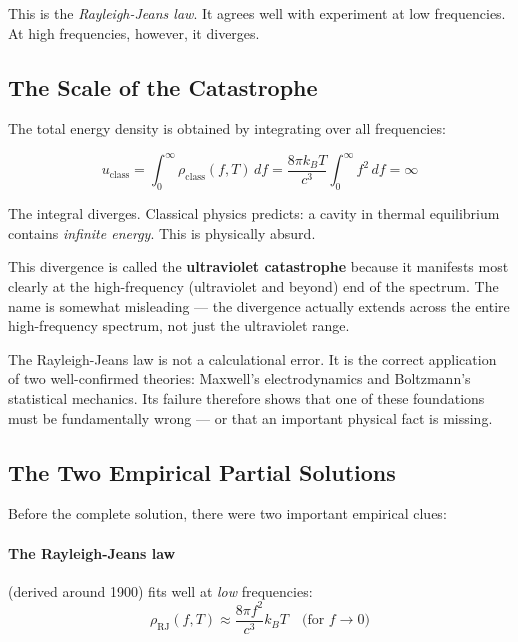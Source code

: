This is the \emph{Rayleigh-Jeans law}. It agrees well with experiment at low 
frequencies. At high frequencies, however, it diverges.

\subsection{The Scale of the Catastrophe}

The total energy density is obtained by integrating over all frequencies:

\begin{equation}
    u_{\text{class}} = \int_0^\infty \rho_{\text{class}}(f, T) \, df 
    = \frac{8\pi k_B T}{c^3} \int_0^\infty f^2 \, df = \infty
    \label{eq:uv_divergence}
\end{equation}

The integral diverges. Classical physics predicts: a cavity in thermal equilibrium 
contains \emph{infinite energy}. This is physically absurd.

This divergence is called the \textbf{ultraviolet catastrophe} because it manifests 
most clearly at the high-frequency (ultraviolet and beyond) end of the spectrum. 
The name is somewhat misleading — the divergence actually extends across the entire 
high-frequency spectrum, not just the ultraviolet range.

\begin{important}
    The Rayleigh-Jeans law is not a calculational error. It is the correct application 
    of two well-confirmed theories: Maxwell's electrodynamics and Boltzmann's 
    statistical mechanics. Its failure therefore shows that one of these foundations 
    must be fundamentally wrong — or that an important physical fact is missing.
\end{important}

\subsection{The Two Empirical Partial Solutions}

Before the complete solution, there were two important empirical clues:

\paragraph{The Rayleigh-Jeans law} (derived around 1900) fits well at \emph{low} 
frequencies:
\begin{equation}
    \rho_{\text{RJ}}(f, T) \approx \frac{8\pi f^2}{c^3} k_B T \quad \text{(for } f \to 0\text{)}
\end{equation}

